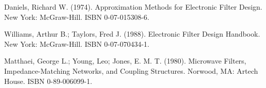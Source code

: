 \documentclass[journal abbreviation, manuscript]{copernicus}
\begin{document}
\begin{thebibliography}{}

Daniels, Richard W. (1974). Approximation Methods for Electronic Filter Design. New York: McGraw-Hill. ISBN 0-07-015308-6.

Williams, Arthur B.; Taylors, Fred J. (1988). Electronic Filter Design Handbook. New York: McGraw-Hill. ISBN 0-07-070434-1.

Matthaei, George L.; Young, Leo; Jones, E. M. T. (1980). Microwave Filters, Impedance-Matching Networks, and Coupling Structures. Norwood, MA: Artech House. ISBN 0-89-006099-1.

\end{thebibliography}







\end{document}
